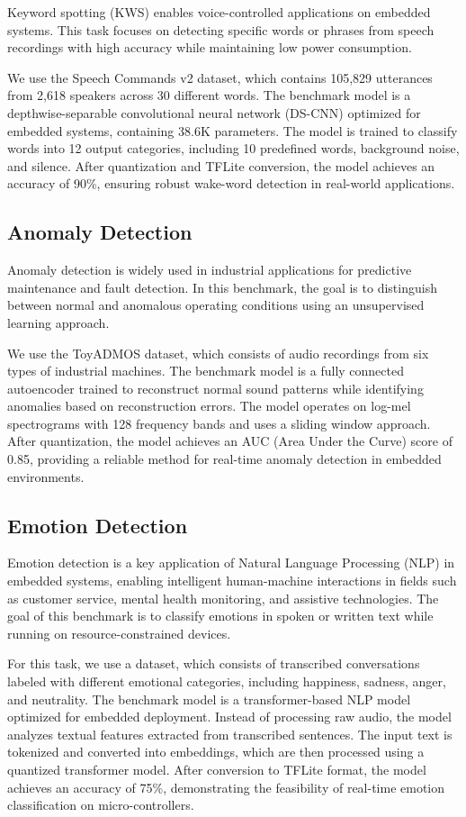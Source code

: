 \documentclass[conference]{IEEEtran}
\begin{document}
Keyword spotting (KWS) enables voice-controlled applications on embedded systems. This task focuses on detecting specific words or phrases from speech recordings with high accuracy while maintaining low power consumption.

We use the Speech Commands v2 dataset, which contains 105,829 utterances from 2,618 speakers across 30 different words. The benchmark model is a depthwise-separable convolutional neural network (DS-CNN) optimized for embedded systems, containing 38.6K parameters. The model is trained to classify words into 12 output categories, including 10 predefined words, background noise, and silence. After quantization and TFLite conversion, the model achieves an accuracy of 90\%, ensuring robust wake-word detection in real-world applications.

\subsection{Anomaly Detection}

Anomaly detection is widely used in industrial applications for predictive maintenance and fault detection. In this benchmark, the goal is to distinguish between normal and anomalous operating conditions using an unsupervised learning approach.

We use the ToyADMOS dataset, which consists of audio recordings from six types of industrial machines. The benchmark model is a fully connected autoencoder trained to reconstruct normal sound patterns while identifying anomalies based on reconstruction errors. The model operates on log-mel spectrograms with 128 frequency bands and uses a sliding window approach. After quantization, the model achieves an AUC (Area Under the Curve) score of 0.85, providing a reliable method for real-time anomaly detection in embedded environments.

\subsection{Emotion Detection}

Emotion detection is a key application of Natural Language Processing (NLP) in embedded systems, enabling intelligent human-machine interactions in fields such as customer service, mental health monitoring, and assistive technologies. The goal of this benchmark is to classify emotions in spoken or written text while running on resource-constrained devices.

For this task, we use a dataset, which consists of transcribed conversations labeled with different emotional categories, including happiness, sadness, anger, and neutrality. The benchmark model is a transformer-based NLP model optimized for embedded deployment. Instead of processing raw audio, the model analyzes textual features extracted from transcribed sentences. The input text is tokenized and converted into embeddings, which are then processed using a quantized transformer model. After conversion to TFLite format, the model achieves an accuracy of 75\%, demonstrating the feasibility of real-time emotion classification on micro-controllers.
\end{document}
